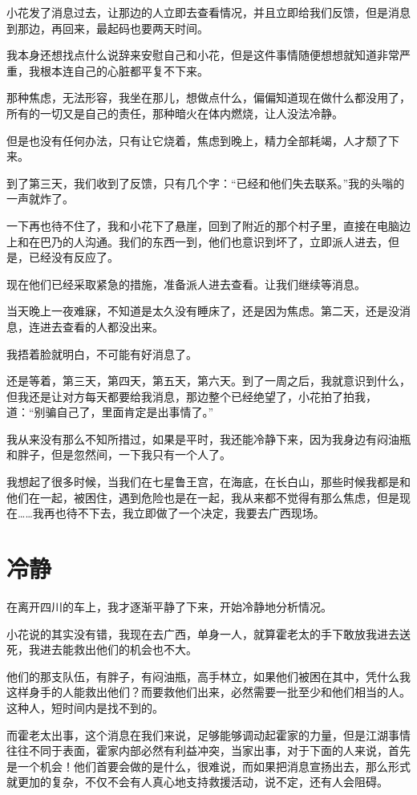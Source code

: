 小花发了消息过去，让那边的人立即去查看情况，并且立即给我们反馈，但是消息到那边，再回来，最起码也要两天时间。

我本身还想找点什么说辞来安慰自己和小花，但是这件事情随便想想就知道非常严重，我根本连自己的心脏都平复不下来。

那种焦虑，无法形容，我坐在那儿，想做点什么，偏偏知道现在做什么都没用了，所有的一切又是自己的责任，那种暗火在体内燃烧，让人没法冷静。

但是也没有任何办法，只有让它烧着，焦虑到晚上，精力全部耗竭，人才颓了下来。

到了第三天，我们收到了反馈，只有几个字：“已经和他们失去联系。”我的头嗡的一声就炸了。

一下再也待不住了，我和小花下了悬崖，回到了附近的那个村子里，直接在电脑边上和在巴乃的人沟通。我们的东西一到，他们也意识到坏了，立即派人进去，但是，已经没有反应了。

现在他们已经采取紧急的措施，准备派人进去查看。让我们继续等消息。

当天晚上一夜难寐，不知道是太久没有睡床了，还是因为焦虑。第二天，还是没消息，连进去查看的人都没出来。

我捂着脸就明白，不可能有好消息了。

还是等着，第三天，第四天，第五天，第六天。到了一周之后，我就意识到什么，但我还是让对方每天都要给我消息，那边整个已经绝望了，小花拍了拍我，道：“别骗自己了，里面肯定是出事情了。”

我从来没有那么不知所措过，如果是平时，我还能冷静下来，因为我身边有闷油瓶和胖子，但是忽然间，一下我只有一个人了。

我想起了很多时候，当我们在七星鲁王宫，在海底，在长白山，那些时候我都是和他们在一起，被困住，遇到危险也是在一起，我从来都不觉得有那么焦虑，但是现在……我再也待不下去，我立即做了一个决定，我要去广西现场。

\chapter{冷静}

在离开四川的车上，我才逐渐平静了下来，开始冷静地分析情况。

小花说的其实没有错，我现在去广西，单身一人，就算霍老太的手下敢放我进去送死，我进去能救出他们的机会也不大。

他们的那支队伍，有胖子，有闷油瓶，高手林立，如果他们被困在其中，凭什么我这样身手的人能救出他们？而要救他们出来，必然需要一批至少和他们相当的人。这种人，短时间内是找不到的。

而霍老太出事，这个消息在我们来说，足够能够调动起霍家的力量，但是江湖事情往往不同于表面，霍家内部必然有利益冲突，当家出事，对于下面的人来说，首先是一个机会！他们首要会做的是什么，很难说，而如果把消息宣扬出去，那么形式就更加的复杂，不仅不会有人真心地支持救援活动，说不定，还有人会阻碍。

